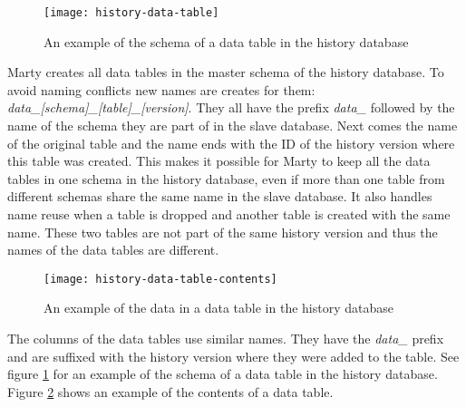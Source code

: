 \begin{figure}[h!]
  \centering
    \texttt{[image: history-data-table]}
  \caption{An example of the schema of a data table in the history database}
  \label{fig:history-data-table-2}
\end{figure}

Marty creates all data tables in the master schema of the history database.
To avoid naming conflicts new names are creates for them: \textit{data\_[schema]\_[table]\_[version]}.
They all have the prefix \textit{data\_} followed by the name of the schema they are part of in the slave database.
Next comes the name of the original table and the name ends with the ID of the history version where this table was created.
This makes it possible for Marty to keep all the data tables in one schema in the history database, even if more than one table from different schemas share the same name in the slave database.
It also handles name reuse when a table is dropped and another table is created with the same name.
These two tables are not part of the same history version and thus the names of the data tables are different.

\begin{figure}[h]
  \centering
    \texttt{[image: history-data-table-contents]}
  \caption{An example of the data in a data table in the history database}
  \label{fig:history-data-table-contents}
\end{figure}

The columns of the data tables use similar names.
They have the \textit{data\_} prefix and are suffixed with the history version where they were added to the table.
See figure \ref{fig:history-data-table-2} for an example of the schema of a data table in the history database.
Figure \ref{fig:history-data-table-contents} shows an example of the contents of a data table.